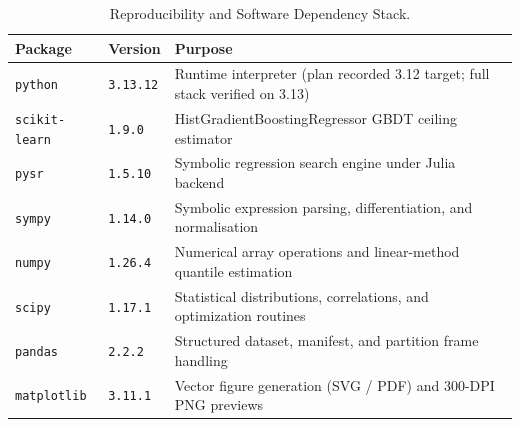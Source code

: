 \begin{table}[t]
\centering
\small
\caption{Reproducibility and Software Dependency Stack.}
\label{tab:reproducibility}
\begin{tabular}{lll}
\toprule
Package & Version & Purpose \\
\midrule
\texttt{python} & \texttt{3.13.12} & Runtime interpreter (plan recorded 3.12 target; full stack verified on 3.13) \\
\texttt{scikit-learn} & \texttt{1.9.0} & HistGradientBoostingRegressor GBDT ceiling estimator \\
\texttt{pysr} & \texttt{1.5.10} & Symbolic regression search engine under Julia backend \\
\texttt{sympy} & \texttt{1.14.0} & Symbolic expression parsing, differentiation, and normalisation \\
\texttt{numpy} & \texttt{1.26.4} & Numerical array operations and linear-method quantile estimation \\
\texttt{scipy} & \texttt{1.17.1} & Statistical distributions, correlations, and optimization routines \\
\texttt{pandas} & \texttt{2.2.2} & Structured dataset, manifest, and partition frame handling \\
\texttt{matplotlib} & \texttt{3.11.1} & Vector figure generation (SVG / PDF) and 300-DPI PNG previews \\
\bottomrule
\end{tabular}
\end{table}
